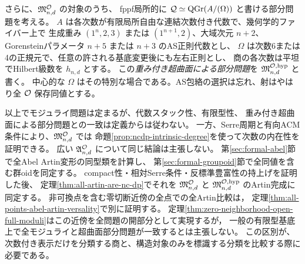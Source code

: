 さらに、$\mathfrak M^{\mathcal O}_{n,d}$ の対象のうち、
fppf局所的に $\mathcal Q\simeq\operatorname{QGr}(A/(\Omega))$ と書ける部分問題を考える。
$A$ は各次数が有限局所自由な連結次数付き代数で、幾何学的ファイバー上で
生成重み $(1^n,2,3)$ または $(1^{n+1},2)$、大域次元 $n+2$、
Gorensteinパラメータ $n+5$ または $n+3$ のAS正則代数とし、
$\Omega$ は次数6または4の正規元で、任意の許される基底変更後にも左右正則とし、
商の各次数は平坦でHilbert級数を $h_{n,d}$ とする。
この\emph{重み付き超曲面による部分問題}を $\mathfrak M^{\mathcal O,\mathrm{hyp}}_{n,d}$ と書く。
中心的な $\Omega$ はその特別な場合である。AS包絡の選択は忘れ、射はやはり全 $\mathcal O$ 保存同値とする。

\begin{remark}[定義と証明すべき性質]
以上でモジュライ問題は定まるが、代数スタック性、有限型性、
重み付き超曲面による部分問題との一致は定義からは従わない。
一方、Serre周期と有向ACM条件により、$\mathfrak M^{\mathcal O}_{n,d}$ では
命題\ref{prop:ncdp-intrinsic-degree}を使って次数の内在性を証明できる。
広い $\mathfrak A^{\mathcal O}_{n,d}$ について同じ結論は主張しない。
第\ref{sec:formal-abel}節で全Abel Artin変形の同型類を計算し、
第\ref{sec:formal-groupoid}節で全同値を含む群oidを同定する。
compact性・相対Serre条件・反標準豊富性の持上げを証明した後、
定理\ref{thm:all-artin-are-nc-dp}でそれを $\mathfrak M^{\mathcal O}_{n,d}$ と
$\mathfrak M^{\mathcal O,\mathrm{hyp}}_{n,d}$ のArtin完成に同定する。
非可換点を含む零切断近傍の全点での全Artin比較は，
定理\ref{thm:all-points-abel-artin-versality}で別に証明する。
定理\ref{thm:zero-neighborhood-open-full-moduli}はこの近傍を全問題の開部分として実現するが，
一般の有限型基底上で全モジュライと超曲面部分問題が一致するとは主張しない。
この区別が、次数付き表示だけを分類する商と、構造対象のみを標識する分類を比較する際に必要である。
\end{remark}
